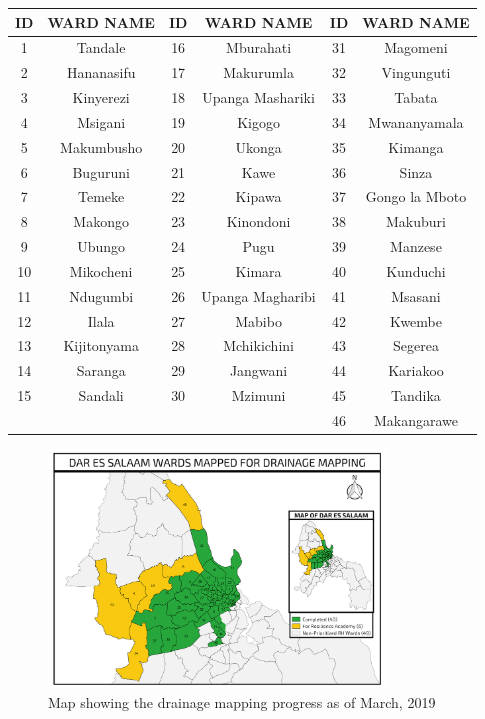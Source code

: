 \documentclass[a4paper,12pt,twoside]{article}
\begin{document}
\begin{center}
\begin{tabular}{|c|c|c|c|c|c|}
\hline
ID & WARD NAME & ID & WARD NAME & ID & WARD NAME\\
\hline
1 & Tandale & 16 & Mburahati & 31 & Magomeni\\
2 & Hananasifu & 17 & Makurumla & 32 & Vingunguti\\
3 & Kinyerezi & 18 & Upanga Mashariki & 33 & Tabata\\
4 & Msigani & 19 & Kigogo & 34 & Mwananyamala\\
5 & Makumbusho & 20 & Ukonga & 35 & Kimanga\\
6 & Buguruni & 21 & Kawe & 36 & Sinza\\
7 & Temeke & 22 & Kipawa & 37 & Gongo la Mboto\\
8 & Makongo & 23 & Kinondoni & 38 & Makuburi\\
9 & Ubungo & 24 & Pugu & 39 & Manzese\\
10 & Mikocheni & 25 & Kimara & 40 & Kunduchi\\
11 & Ndugumbi & 26 & Upanga Magharibi & 41 & Msasani\\
12 & Ilala & 27 & Mabibo & 42 & Kwembe\\
13 & Kijitonyama & 28 & Mchikichini & 43 & Segerea\\
14 & Saranga & 29 & Jangwani & 44 & Kariakoo\\
15 & Sandali & 30 & Mzimuni & 45 & Tandika\\
{} & {} & {} & {} & 46 & Makangarawe\\
 \hline
\end{tabular}
\end{center}

\begin{figure}[h]
  \color{RHgreen}\caption{Map showing the drainage mapping progress as of March, 2019}
  \centering
  \includegraphics[width=0.8\textwidth]{images/Drain_Mapping.png}
\end{figure}
\end{document}
